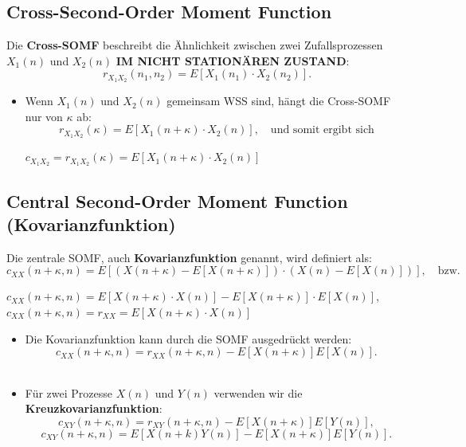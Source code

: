 \documentclass[12pt]{article}
\begin{document}
   \subsection{Cross-Second-Order Moment Function}
      Die \textbf{Cross-SOMF} beschreibt die Ähnlichkeit zwischen zwei Zufallsprozessen \( X_1(n) \) und \( X_2(n) \) \textbf{IM NICHT STATIONÄREN ZUSTAND}:
      \[
         r_{X_1 X_2}(n_1, n_2) = E[X_1(n_1) \cdot X_2(n_2)].
      \]

      \begin{itemize}
         \item Wenn \( X_1(n) \) und \( X_2(n) \) gemeinsam WSS sind, hängt die Cross-SOMF nur von \( \kappa\) ab:
         \[
            r_{X_1 X_2}(\kappa) = E[X_1(n + \kappa) \cdot X_2(n)], \quad \text{und somit ergibt sich}
         \]
         \begin{center}
            \(c_{X_1 X_2}= r_{X_1 X_2}(\kappa) = E[X_1(n + \kappa) \cdot X_2(n)]\)
         \end{center} 
      \end{itemize}

   \subsection{Central Second-Order Moment Function (Kovarianzfunktion)}
      Die zentrale SOMF, auch \textbf{Kovarianzfunktion} genannt, wird definiert als:
      \[
         c_{XX}(n+\kappa, n) = E[(X(n+\kappa) - E[X(n+\kappa)]) \cdot (X(n) - E[X(n)])], \quad \text{bzw.}
      \] 
      \begin{center}
         \(c_{XX}(n+\kappa, n) = E[X(n+\kappa) \cdot X(n)] - E[X(n+\kappa)] \cdot E[X(n)]\), \quad {} \\[10pt]
      \(c_{XX}(n+\kappa, n) = r_{XX} = E[X(n+\kappa) \cdot X(n)]\)
      \end{center}
      \medskip
      \begin{itemize}
         \item Die Kovarianzfunktion kann durch die SOMF ausgedrückt werden:
         \[
         c_{XX}(n+\kappa, n) = r_{XX}(n+\kappa, n) - E[X(n+\kappa)]E[X(n)].
         \] \\[10pt]
         \item Für zwei Prozesse \( X(n) \) und \( Y(n) \) verwenden wir die \textbf{Kreuzkovarianzfunktion}:
         \[
         c_{XY}(n+\kappa, n) = r_{XY}(n+\kappa, n) - E[X(n+\kappa)]E[Y(n)],
         \]
         \[
         c_{XY}(n+\kappa, n) = E[X(n+k)Y(n)] - E[X(n+\kappa)]E[Y(n)].
         \] \\[5pt]
   \end{itemize}
\end{document}
